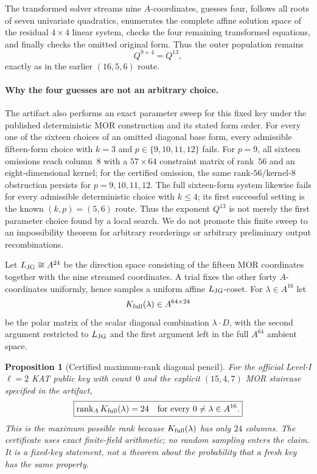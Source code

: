 \documentclass[11pt]{article}
\newtheorem{proposition}[theorem]{Proposition}
\newcommand{\rank}{\operatorname{rank}}
\begin{document}
The transformed solver streams nine $A$-coordinates, guesses four, follows
all roots of seven univariate quadratics, enumerates the complete affine
solution space of the residual $4\times4$ linear system, checks the four
remaining transformed equations, and finally checks the omitted original
form.  Thus the outer population remains
\begin{equation}
  Q^{9+4}=Q^{13},                                  \label{eq:jg-outer-pop}
\end{equation}
exactly as in the earlier $(16,5,6)$ route.

\paragraph{Why the four guesses are not an arbitrary choice.}
The artifact also performs an exact parameter sweep for this fixed key under
the published deterministic MOR construction and its stated form order.  For
every one of the sixteen choices of an omitted diagonal base form, every
admissible fifteen-form choice with $k=3$ and
$p\in\{9,10,11,12\}$ fails.  For $p=9$, all sixteen omissions reach column~8
with a $57\times64$ constraint matrix of rank~$56$ and an eight-dimensional
kernel; for the certified omission, the same rank-$56$/kernel-$8$ obstruction
persists for $p=9,10,11,12$.  The full sixteen-form system likewise fails for
every admissible deterministic choice with $k\le4$; its first successful
setting is the known $(k,p)=(5,6)$ route.  Thus the exponent $Q^{13}$ is not
merely the first parameter choice found by a local search.  We do not promote
this finite sweep to an impossibility theorem for arbitrary reorderings or
arbitrary preliminary output recombinations.

Let $L_{\rm JG}\cong A^{24}$ be the direction space consisting of the fifteen
MOR coordinates together with the nine streamed coordinates.  A trial fixes
the other forty $A$-coordinates uniformly, hence samples a uniform affine
$L_{\rm JG}$-coset.  For $\lambda\in A^{16}$ let
\[
  K_{\rm full}(\lambda)\in A^{64\times24}
\]
be the polar matrix of the scalar diagonal combination
$\lambda\cdot D$, with the second argument restricted to $L_{\rm JG}$ and the
first argument left in the full $A^{64}$ ambient space.

\begin{proposition}[Certified maximum-rank diagonal pencil]
\label{prop:jg-rank24}
For the official Level-I $\ell=2$ KAT public key with count~$0$ and the
explicit $(15,4,7)$ MOR staircase specified in the artifact,
\begin{equation}
  \boxed{\rank_A K_{\rm full}(\lambda)=24
         \quad\text{for every }0\ne\lambda\in A^{16}.}
  \label{eq:jg-rank24}
\end{equation}
This is the maximum possible rank because $K_{\rm full}(\lambda)$ has only
$24$ columns.  The certificate uses exact finite-field arithmetic; no random
sampling enters the claim.  It is a fixed-key statement, not a theorem about
the probability that a fresh key has the same property.
\end{proposition}
\end{document}
